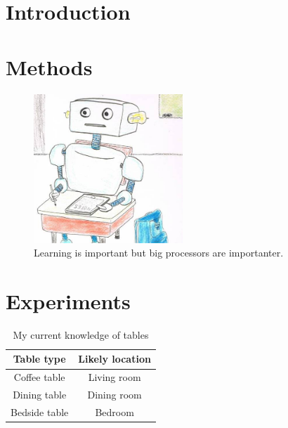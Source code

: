 \documentclass[twoside]{article}
\begin{document}
\begin{multicols}{2} %

\section{Introduction}

\lipsum[2-4]



\section{Methods}

\lipsum[5-9]

\begin{figure}[H]
\centering
\includegraphics[width=0.5\textwidth]{learning}
\caption{Learning is important but big processors are importanter. \cite{alpaydin2004introduction}}
\label{fig:learning}
\end{figure}


\section{Experiments}

\lipsum[10-16]

\begin{table}[H]
\caption{My current knowledge of tables}
\centering
\begin{tabular}{cc}
\textbf{Table type} & \textbf{Likely location}\\
\midrule
Coffee table & Living room\\
Dining table & Dining room\\
Bedside table & Bedroom
\end{tabular}
\end{table}


\end{multicols}
\end{document}
